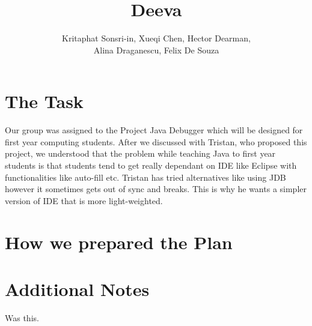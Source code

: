 \documentclass[11pt]{article}
\newcommand{\subtitle}[1]{%
  \posttitle{%
    \par\end{center}
    \begin{center}\large#1\end{center}
    \vskip0.5em}%
}
\begin{document}
\title{Deeva}
\subtitle{Planing Report}
\author{Kritaphat Sonsri-in, Xueqi Chen, Hector Dearman, \\Alina Draganescu, Felix De Souza}

\maketitle

\section{The Task}
Our group was assigned to the Project Java Debugger which will be designed for first year computing students. After we discussed with Tristan, who proposed this project, we understood that the problem while teaching Java to first year students is that students tend to get really dependant on IDE like Eclipse with functionalities like auto-fill etc. Tristan has tried alternatives like using JDB however it sometimes gets out of sync and breaks. This is why he wants a simpler version of IDE that is more light-weighted. 

\section{How we prepared the Plan}

\section{Additional Notes}
Was this.
\end{document}
